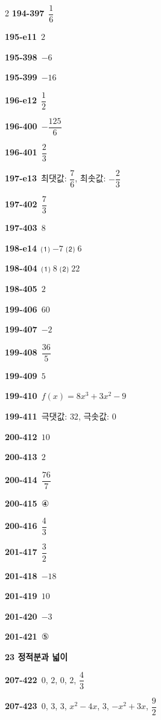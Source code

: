 \documentclass[10pt,a4paper]{article}
\begin{document}
\begin{multicols}{2}
\noindent\textbf{194-397}\ $\dfrac{1}{6}$\par
\noindent\textbf{195-e11}\ $2$\par
\noindent\textbf{195-398}\ $-6$\par
\noindent\textbf{195-399}\ $-16$\par
\noindent\textbf{196-e12}\ $\dfrac{1}{2}$\par
\noindent\textbf{196-400}\ $-\dfrac{125}{6}$\par
\noindent\textbf{196-401}\ $\dfrac{2}{3}$\par
\noindent\textbf{197-e13}\ 최댓값: $\dfrac{7}{6}$, 최솟값: $-\dfrac{2}{3}$\par
\noindent\textbf{197-402}\ $\dfrac{7}{3}$\par
\noindent\textbf{197-403}\ $8$\par
\noindent\textbf{198-e14}\ ⑴ $-7$ ⑵ $6$\par
\noindent\textbf{198-404}\ ⑴ $8$ ⑵ $22$\par
\noindent\textbf{198-405}\ $2$\par
\noindent\textbf{199-406}\ $60$\par
\noindent\textbf{199-407}\ $-2$\par
\noindent\textbf{199-408}\ $\dfrac{36}{5}$\par
\noindent\textbf{199-409}\ $5$\par
\noindent\textbf{199-410}\ $f(x)=8x^3+3x^2-9$\par
\noindent\textbf{199-411}\ 극댓값: $32$, 극솟값: $0$\par
\noindent\textbf{200-412}\ $10$\par
\noindent\textbf{200-413}\ $2$\par
\noindent\textbf{200-414}\ $\dfrac{76}{7}$\par
\noindent\textbf{200-415}\ ④\par
\noindent\textbf{200-416}\ $\dfrac{4}{3}$\par
\noindent\textbf{201-417}\ $\dfrac{3}{2}$\par
\noindent\textbf{201-418}\ $-18$\par
\noindent\textbf{201-419}\ $10$\par
\noindent\textbf{201-420}\ $-3$\par
\noindent\textbf{201-421}\ ⑤\par
\noindent\textbf{23 정적분과 넓이}\par\smallskip
\noindent\textbf{207-422}\ $0$, $2$, $0$, $2$, $\dfrac{4}{3}$\par
\noindent\textbf{207-423}\ $0$, $3$, $3$, $x^2-4x$, $3$, $-x^2+3x$, $\dfrac{9}{2}$\par

\end{multicols}
\end{document}
